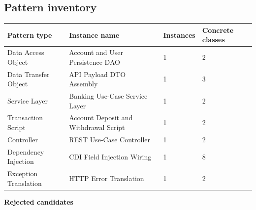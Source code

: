\documentclass[11pt,a4paper]{article}
\begin{document}
\subsection{Pattern inventory}
{\small
\begin{center}\begin{tabular}{@{}p{3.6cm}p{6.6cm}p{1.9cm}p{2.6cm}@{}}
\toprule \textbf{Pattern type} & \textbf{Instance name} & \textbf{Instances} & \textbf{Concrete classes} \\ \midrule
Data Access Object & Account and User Persistence DAO & 1 & 2 \\
Data Transfer Object & API Payload DTO Assembly & 1 & 3 \\
Service Layer & Banking Use-Case Service Layer & 1 & 2 \\
Transaction Script & Account Deposit and Withdrawal Script & 1 & 2 \\
Controller & REST Use-Case Controller & 1 & 2 \\
Dependency Injection & CDI Field Injection Wiring & 1 & 8 \\
Exception Translation & HTTP Error Translation & 1 & 2 \\
\bottomrule\end{tabular}\end{center}
}
\textbf{Rejected candidates}
\end{document}

